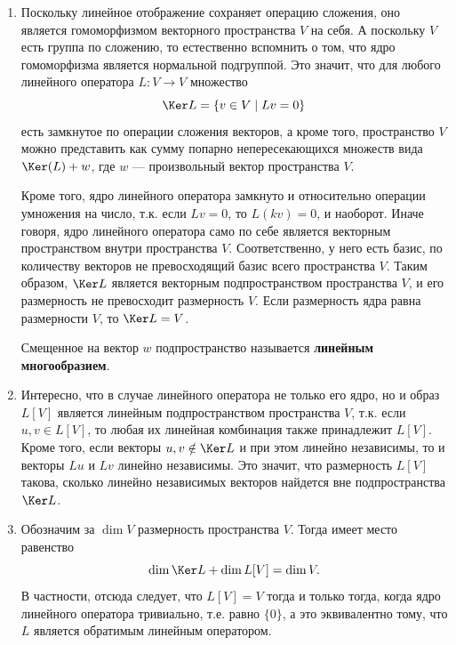 
\begin{enumerate}
\item Поскольку линейное отображение сохраняет операцию сложения, оно является гомоморфизмом векторного пространства $V$ на себя. А поскольку $V$ есть группа по сложению, то естественно вспомнить о том, что ядро гомоморфизма является нормальной подгруппой. Это значит, что для любого линейного оператора $L:V\to V$ множество
$$
\Ker L = \{v\in V\mid Lv=0\}
$$
есть замкнутое по операции сложения векторов, а кроме того, пространство $V$ можно представить как сумму попарно непересекающихся множеств вида $\Ker(L)+w$, где $w$ --- произвольный вектор пространства $V$.

Кроме того, ядро линейного оператора замкнуто и относительно операции умножения на число, т.к. если $Lv=0$, то $L(kv)=0$, и наоборот. Иначе говоря, ядро линейного оператора само по себе является векторным пространством внутри пространства $V$. Соответственно, у него есть базис, по количеству векторов не превосходящий базис всего пространства $V$. Таким образом, $\Ker L$ является векторным подпространством пространства $V$, и его размерность не превосходит размерность $V$. Если размерность ядра равна размерности $V$, то $\Ker L=V$.

Смещенное на вектор $w$ подпространство называется \textbf{линейным многообразием}.


\item Интересно, что в случае линейного оператора не только его ядро, но и образ $L[V]$ является линейным подпространством пространства $V$, т.к. если $u,v\in L[V]$, то любая их линейная комбинация также принадлежит $L[V]$. Кроме того, если векторы $u,v\notin\Ker L$ и при этом линейно независимы, то и векторы $Lu$ и $Lv$ линейно независимы. Это значит, что размерность $L[V]$ такова, сколько линейно независимых векторов найдется вне подпространства $\Ker L$.
\item Обозначим за $\dim V$ размерность пространства $V$. Тогда имеет место равенство
$$
\dim \Ker L + \dim L[V] = \dim V.
$$
В частности, отсюда следует, что $L[V]=V$ тогда и только тогда, когда ядро линейного оператора тривиально, т.е. равно $\{0\}$, а это эквивалентно тому, что $L$ является обратимым линейным оператором.


\end{enumerate}

